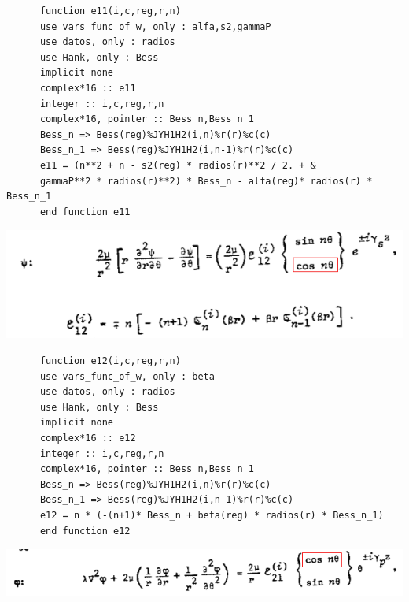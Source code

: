 \documentclass [11pt,spanish]{article}
\begin{document}
\begingroup
\fontsize{10pt}{12pt}
\selectfont
{}
\begin{shaded}
\begin{verbatim}
      function e11(i,c,reg,r,n)
      use vars_func_of_w, only : alfa,s2,gammaP
      use datos, only : radios
      use Hank, only : Bess
      implicit none
      complex*16 :: e11
      integer :: i,c,reg,r,n
      complex*16, pointer :: Bess_n,Bess_n_1
      Bess_n => Bess(reg)%JYH1H2(i,n)%r(r)%c(c)
      Bess_n_1 => Bess(reg)%JYH1H2(i,n-1)%r(r)%c(c)
      e11 = (n**2 + n - s2(reg) * radios(r)**2 / 2. + & 
      gammaP**2 * radios(r)**2) * Bess_n - alfa(reg)* radios(r) * Bess_n_1
      end function e11
\end{verbatim}
\end{shaded}
\endgroup
\includegraphics[scale=0.5]{e12}
\begingroup
\fontsize{10pt}{12pt}
\selectfont
{}
\begin{shaded}
\begin{verbatim}
      function e12(i,c,reg,r,n)
      use vars_func_of_w, only : beta
      use datos, only : radios
      use Hank, only : Bess
      implicit none
      complex*16 :: e12
      integer :: i,c,reg,r,n
      complex*16, pointer :: Bess_n,Bess_n_1
      Bess_n => Bess(reg)%JYH1H2(i,n)%r(r)%c(c)
      Bess_n_1 => Bess(reg)%JYH1H2(i,n-1)%r(r)%c(c)
      e12 = n * (-(n+1)* Bess_n + beta(reg) * radios(r) * Bess_n_1)
      end function e12
\end{verbatim}
\end{shaded}
\endgroup
\includegraphics[scale=0.5]{e21a}
\end{document}

